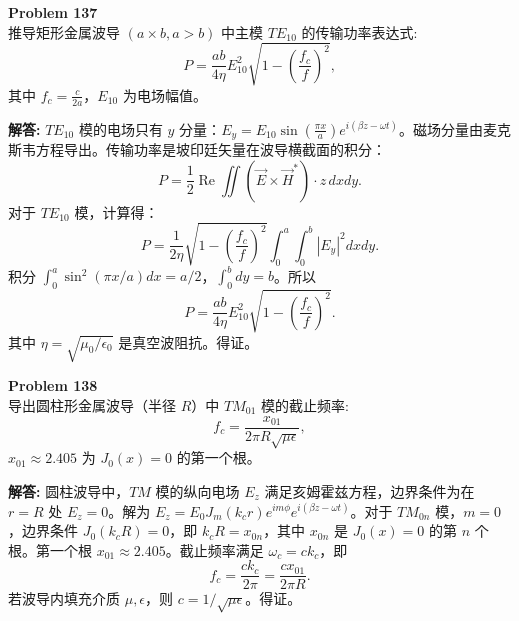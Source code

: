 \documentclass[12pt, a4paper, oneside]{ctexart}
\newenvironment{solution}{\par\noindent\textbf{解答:}\quad}{\par}
\begin{document}
\begin{mdframed}[backgroundcolor=gray!10, linewidth=0pt]
    \textbf{Problem 137} \\
    推导矩形金属波导 $(a \times b, a > b)$ 中主模 $TE_{10}$ 的传输功率表达式:
    \[
    P = \frac{a b}{4\eta} E_{10}^2 \sqrt{1 - \left( \frac{f_c}{f} \right)^2 },
    \]
    其中 $f_c = \frac{c}{2a}$，$E_{10}$ 为电场幅值。
\end{mdframed}
\begin{solution}
    $TE_{10}$ 模的电场只有 $y$ 分量：$E_y = E_{10} \sin\left( \frac{\pi x}{a} \right) e^{i(\beta z - \omega t)}$。磁场分量由麦克斯韦方程导出。传输功率是坡印廷矢量在波导横截面的积分：
    \[
    P = \frac{1}{2} \operatorname{Re} \iint (\vec{E} \times \vec{H}^*) \cdot \hat{z} \, dx dy.
    \]
    对于 $TE_{10}$ 模，计算得：
    \[
    P = \frac{1}{2\eta} \sqrt{1 - \left( \frac{f_c}{f} \right)^2 } \int_0^a \int_0^b |E_y|^2 dx dy.
    \]
    积分 $\int_0^a \sin^2(\pi x/a) dx = a/2$，$\int_0^b dy = b$。所以
    \[
    P = \frac{a b}{4\eta} E_{10}^2 \sqrt{1 - \left( \frac{f_c}{f} \right)^2 }.
    \]
    其中 $\eta = \sqrt{\mu_0 / \epsilon_0}$ 是真空波阻抗。得证。
\end{solution}

\begin{mdframed}[backgroundcolor=gray!10, linewidth=0pt]
    \textbf{Problem 138} \\
    导出圆柱形金属波导（半径 $R$）中 $TM_{01}$ 模的截止频率:
    \[
    f_c = \frac{x_{01}}{2\pi R \sqrt{\mu\epsilon}},
    \]
    $x_{01} \approx 2.405$ 为 $J_0(x)=0$ 的第一个根。
\end{mdframed}
\begin{solution}
    圆柱波导中，$TM$ 模的纵向电场 $E_z$ 满足亥姆霍兹方程，边界条件为在 $r=R$ 处 $E_z=0$。解为 $E_z = E_0 J_m(k_c r) e^{im\phi} e^{i(\beta z - \omega t)}$。对于 $TM_{0n}$ 模，$m=0$，边界条件 $J_0(k_c R)=0$，即 $k_c R = x_{0n}$，其中 $x_{0n}$ 是 $J_0(x)=0$ 的第 $n$ 个根。第一个根 $x_{01} \approx 2.405$。截止频率满足 $\omega_c = c k_c$，即
    \[
    f_c = \frac{c k_c}{2\pi} = \frac{c x_{01}}{2\pi R}.
    \]
    若波导内填充介质 $\mu, \epsilon$，则 $c = 1/\sqrt{\mu\epsilon}$。得证。
\end{solution}
\end{document}
